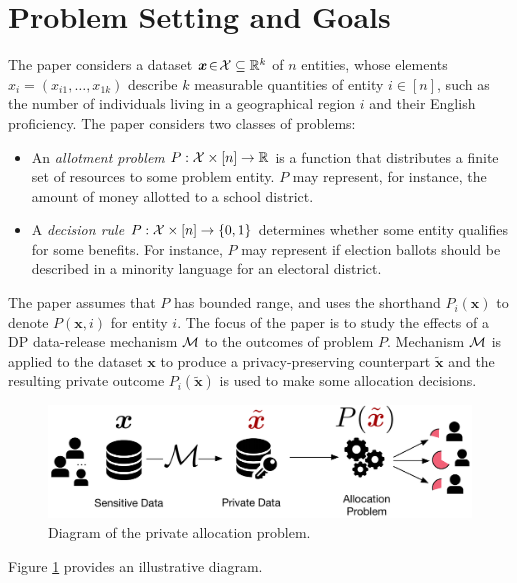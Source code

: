 \section*{Problem Setting and Goals}
\label{sec:setting}


The paper considers a dataset $\bm{x} \!\in\! \mathcal{X} \subseteq \mathbb{R}^k$ of $n$ entities,
whose elements $x_i= (x_{i1},\ldots, x_{1k})$ describe $k$ measurable
quantities of entity $i \!\in\! [n]$, such as the number of individuals living
in a geographical region $i$ and their English proficiency.
The paper considers two classes of problems:
\begin{itemize}[leftmargin=*,labelsep=2pt,itemsep=0pt,parsep=2pt,topsep=2pt]
	\item An \emph{allotment problem} $P : \mathcal{X} \times [n] \to \mathbb{R}$ is a function that distributes a finite set of resources to some problem entity. $P$ may represent, for instance, the amount of money allotted to a school district.
	\item A \emph{decision rule} $P: \mathcal{X} \times [n] \to \{0,1\}$
	determines whether some entity qualifies for some benefits. For
	instance, $P$ may represent if election ballots should be described
	in a minority language for an electoral district.
\end{itemize}
The paper assumes that $P$ has bounded range, and uses the shorthand
$P_i(\bm{x})$ to denote $P(\bm{x}, i)$ for entity $i$.
%
The focus of the paper is to study the effects of a DP data-release
mechanism $\mathcal{M}$ to the outcomes of problem $P$. Mechanism $\mathcal{M}$ is
applied to the dataset $\bm{x}$ to produce a privacy-preserving
counterpart $\tilde{\bm{x}}$ and the resulting private outcome
$P_i(\tilde{\bm{x}})$ is used to make some allocation decisions.

\begin{figure}[!t]
	\centering
	\includegraphics[width=0.9\columnwidth]{images/figure.pdf}
	\caption{Diagram of the private allocation problem.}
	\label{fig:framework}
\end{figure}
Figure \ref{fig:framework} provides an illustrative diagram.


